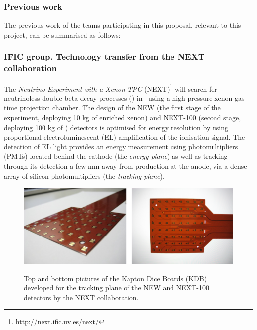 \subsubsection*{Previous work }


The previous work of the teams participating in this proposal, relevant to this project, can be summarised as follows:

\subsubsection*{IFIC group. Technology transfer from the NEXT collaboration}

The \emph{Neutrino Experiment with a Xenon TPC} (NEXT)\footnote{http://next.ific.uv.es/next/} will search for neutrinoless double beta decay processes (\bbonu) in \XE\ using a  high-pressure xenon gas time projection chamber. The design of the NEW (the first stage of the experiment, deploying 10 kg of enriched xenon) and NEXT-100 (second stage, deploying 100 kg of \XE) detectors is optimised for energy resolution by using proportional electroluminescent (EL) amplification of the ionisation signal. The detection of EL light provides an energy measurement using photomultipliers (PMTs) located behind the cathode (the \emph{energy plane}) as well as tracking through its detection a few mm away from production at the anode, via a dense array of silicon photomultipliers (the \emph{tracking plane}).

\begin{figure}[!htb]
	\centering
	\includegraphics[scale=0.5]{img/KDB2.png}\\
	\caption{\label{fig.KDB} Top and bottom pictures of the Kapton Dice Boards (KDB) developed for the tracking plane of the NEW and NEXT-100 detectors by the NEXT collaboration.}
\end{figure}

